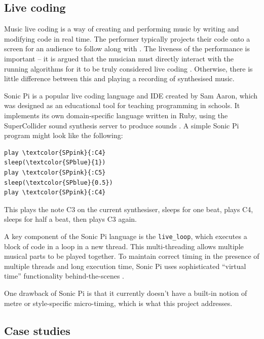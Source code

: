 \documentclass[12pt,twoside,openright]{report}
\begin{document}
\subsection{Live coding} \label{live_coding_background}

Music live coding is a way of creating and performing music by writing and
modifying code in real time. The performer typically projects their code onto a
screen for an audience to follow along with \cite{magnusson2011}. The liveness of the
performance is important -- it is argued that the musician must directly
interact with the running algorithms for it to be truly considered live coding
\cite{collins2011}. Otherwise, there is little difference between this and playing a
recording of synthesised music.

Sonic Pi is a popular live coding language and IDE created by Sam Aaron, which
was designed as an educational tool for teaching programming in schools. It
implements its own domain-specific language written in Ruby, using the
SuperCollider sound synthesis server to produce sounds \cite{aaron2013}. A simple
Sonic Pi program might look like the following:

\begin{BVerbatim}[commandchars=\\\{\}]
play \textcolor{SPpink}{:C4}
sleep(\textcolor{SPblue}{1})
play \textcolor{SPpink}{:C5}
sleep(\textcolor{SPblue}{0.5})
play \textcolor{SPpink}{:C4}
\end{BVerbatim}

This plays the note C3 on the current synthesiser, sleeps for one beat, plays C4,
sleeps for half a beat, then plays C3 again.

A key component of the Sonic Pi language is the \verb'live_loop', which executes a
block of code in a loop in a new thread. This multi-threading allows multiple
musical parts to be played together. To maintain correct timing in the presence
of multiple threads and long execution time, Sonic Pi uses sophisticated
``virtual time'' functionality behind-the-scenes \cite{aaron2014}.

One drawback of Sonic Pi is that it currently doesn't have a built-in notion of
metre or style-specific micro-timing, which is what this project addresses.


\subsection{Case studies} \label{case_studies}
\end{document}
